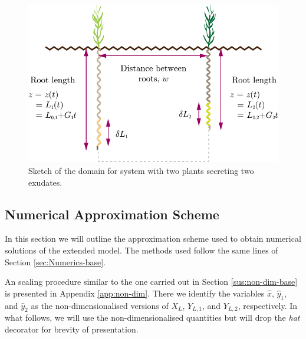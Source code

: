 \documentclass[11pt]{article}
\numberwithin{equation}{section}
\begin{document}
\begin{figure}[!htb]
    \centering
    \includegraphics[scale=0.7]{Figures/Third-plot.pdf}
    \caption{Sketch of the domain for system with two plants secreting two exudates.}
    \label{fig:2roots-b}
\end{figure}





















\subsection{Numerical Approximation Scheme}
\label{sec:Numerics-extension}

In this section we will outline the approximation scheme used to obtain numerical solutions of the extended model. The methods used follow the same lines of Section \ref{sec:Numerics-base}. 

An scaling procedure similar to the one carried out in Section \ref{sus:non-dim-base} is presented in Appendix \ref{app:non-dim}. There we identify the variables \( \hat x\), \(\hat y_1\), and \(\hat y_2\) as the non-dimensionalised versions of \(X_L\), \(Y_{L,1}\), and \(Y_{L,2}\), respectively. In what follows, we will use the non-dimensionalised quantities but will drop the \emph{hat} decorator for brevity of presentation.
\end{document}
